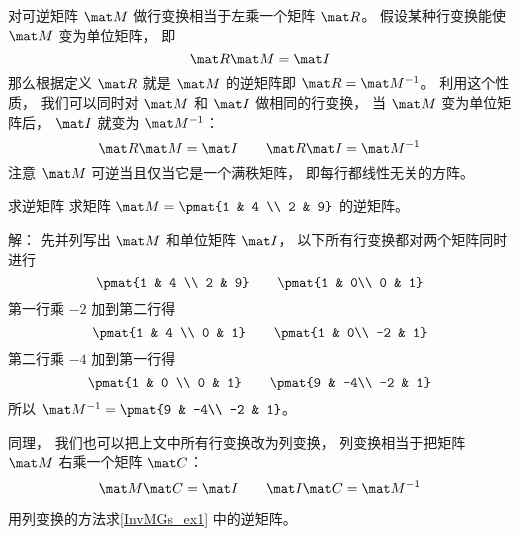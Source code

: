 

对可逆矩阵 $\mat M$ 做行变换相当于左乘一个矩阵 $\mat R$。 假设某种行变换能使 $\mat M$ 变为单位矩阵， 即
\begin{equation}
\mat R \mat M = \mat I
\end{equation}
那么根据定义 $\mat R$ 就是 $\mat M$ 的逆矩阵即 $\mat R = \mat M^{-1}$。 利用这个性质， 我们可以同时对 $\mat M$ 和 $\mat I$ 做相同的行变换， 当 $\mat M$ 变为单位矩阵后， $\mat I$ 就变为 $\mat M^{-1}$：
\begin{equation}
\mat R\mat M = \mat I
\qquad
\mat R \mat I = \mat M^{-1}
\end{equation}
注意 $\mat M$ 可逆当且仅当它是一个满秩矩阵， 即每行都线性无关的方阵。

\begin{example}{求逆矩阵}\label{InvMGs_ex1}
求矩阵 $\mat M = \pmat{1 & 4 \\ 2 & 9}$ 的逆矩阵。

解： 先并列写出 $\mat M$ 和单位矩阵 $\mat I$， 以下所有行变换都对两个矩阵同时进行
\begin{equation}
\pmat{1 & 4 \\ 2 & 9} \qquad \pmat{1 & 0\\ 0 & 1}
\end{equation}
第一行乘 $-2$ 加到第二行得
\begin{equation}
\pmat{1 & 4 \\ 0 & 1} \qquad \pmat{1 & 0\\ -2 & 1}
\end{equation}
第二行乘 $-4$ 加到第一行得
\begin{equation}
\pmat{1 & 0 \\ 0 & 1} \qquad \pmat{9 & -4\\ -2 & 1}
\end{equation}
所以 $\mat M^{-1} = \pmat{9 & -4\\ -2 & 1}$。
\end{example}

同理， 我们也可以把上文中所有行变换改为列变换， 列变换相当于把矩阵 $\mat M$ 右乘一个矩阵 $\mat C$：
\begin{equation}
\mat M\mat C = \mat I
\qquad
\mat I\mat C = \mat M^{-1}
\end{equation}
\begin{exercise}{}
用列变换的方法求\autoref{InvMGs_ex1} 中的逆矩阵。
\end{exercise}
